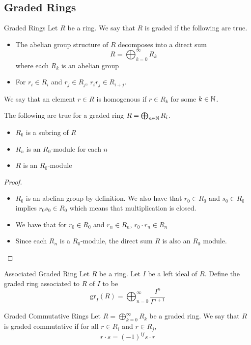 \documentclass[a4paper]{article}
\begin{document}
\subsection{Graded Rings}
\begin{defn}{Graded Rings}{} Let $R$ be a ring. We say that $R$ is graded if the following are true. 
\begin{itemize}
\item The abelian group structure of $R$ decomposes into a direct sum $$R=\bigoplus_{k=0}^\infty R_k$$ where each $R_k$ is an abelian group 
\item For $r_i\in R_i$ and $r_j\in R_j$, $r_ir_j\in R_{i+j}$. 
\end{itemize}
We say that an element $r\in R$ is homogenous if $r\in R_k$ for some $k\in\mathbb{N}$. 
\end{defn}

\begin{prp}{}{} The following are true for a graded ring $R=\bigoplus_{n\in\mathbb{N}}R_i$. 
\begin{itemize}
\item $R_0$ is a subring of $R$
\item $R_n$ is an $R_0$-module for each $n$
\item $R$ is an $R_0$-module
\end{itemize} 
\begin{proof}~\\
\begin{itemize}
\item $R_0$ is an abelian group by definition. We also have that $r_0\in R_0$ and $s_0\in R_0$ implies $r_0s_0\in R_0$ which means that multiplication is closed. 
\item We have that for $r_0\in R_0$ and $r_n\in R_n$, $r_0\cdot r_n\in R_n$
\item Since each $R_n$ is a $R_0$-module, the direct sum $R$ is also an $R_0$ module. 
\end{itemize}
\end{proof}
\end{prp}

\begin{defn}{Associated Graded Ring}{} Let $R$ be a ring. Let $I$ be a left ideal of $R$. Define the graded ring associated to $R$ of $I$ to be $$\text{gr}_I(R)=\bigoplus_{n=0}^\infty\frac{I^n}{I^{n+1}}$$
\end{defn}

\begin{defn}{Graded Commutative Rings}{} Let $R=\bigoplus_{k=0}^\infty R_k$ be a graded ring. We say that $R$ is graded commutative if for all $r\in R_i$ and $r\in R_j$, $$r\cdot s=(-1)^{ij}s\cdot r$$
\end{defn}
\end{document}
